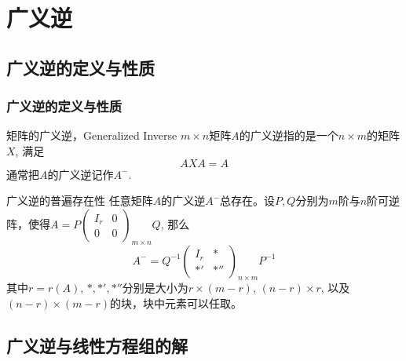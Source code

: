 
\section{广义逆}


\subsection{广义逆的定义与性质}


\begin{frame}
\frametitle{广义逆的定义与性质}

\begin{block}{矩阵的广义逆，Generalized Inverse}
$m\times n$矩阵$A$的广义逆指的是一个$n\times m$的矩阵$X$, 满足
$$AXA = A$$
通常把$A$的广义逆记作$A^-$.
\end{block}

\pause

\begin{block}{广义逆的普遍存在性}
任意矩阵$A$的广义逆$A^-$总存在。设$P,Q$分别为$m$阶与$n$阶可逆阵，使得$A = P \begin{pmatrix} I_r & 0 \\ 0 & 0 \end{pmatrix}_{m\times n}\!\!\!\!\!\!\!\!\!\!\! Q$, 那么
$$A^- = Q^{-1} \begin{pmatrix} I_r & * \\ *' & *'' \end{pmatrix}_{n\times m}\!\!\!\!\!\!\!\!\!\!\! P^{-1}$$
其中$r = r(A)$, $*,*',*''$分别是大小为$r \times (m-r)$, $(n-r) \times r$, 以及$(n-r) \times (m-r)$的块，块中元素可以任取。
\end{block}

\end{frame}


\subsection{广义逆与线性方程组的解}


